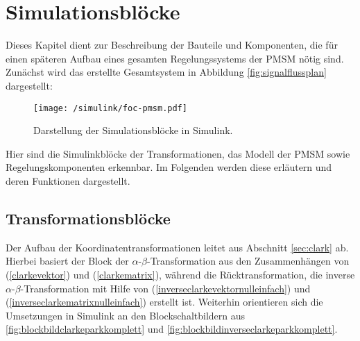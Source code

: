 

\section{Simulationsblöcke}\label{sec:math-model-pmsm}

Dieses Kapitel dient zur Beschreibung der Bauteile und Komponenten, die für einen späteren Aufbau eines gesamten Regelungssystems der PMSM nötig sind.
Zunächst wird das erstellte Gesamtsystem in Abbildung \ref{fig:signalflussplan} dargestellt:

\begin{figure}[h!]
	\texttt{[image: /simulink/foc-pmsm.pdf]}
	\label{fig:foc-pmsm}
	\caption{Darstellung der Simulationsblöcke in Simulink.}
\end{figure}

Hier sind die Simulinkblöcke der Transformationen, das Modell der PMSM sowie Regelungskomponenten erkennbar.
Im Folgenden werden diese erläutern und deren Funktionen dargestellt.

\subsection{Transformationsblöcke}

Der Aufbau der Koordinatentransformationen leitet aus Abschnitt \ref{sec:clark} ab. 
Hierbei basiert der Block der $\alpha$-$\beta$-Transformation aus den Zusammenhängen von (\ref{clarkevektor}) und (\ref{clarkematrix}), während die Rücktransformation, die inverse $\alpha$-$\beta$-Transformation mit Hilfe von (\ref{inverseclarkevektornulleinfach}) und (\ref{inverseclarkematrixnulleinfach}) erstellt ist.
Weiterhin orientieren sich die Umsetzungen in Simulink an den Blockschaltbildern aus \ref{fig:blockbildclarkeparkkomplett} und \ref{fig:blockbildinverseclarkeparkkomplett}.



